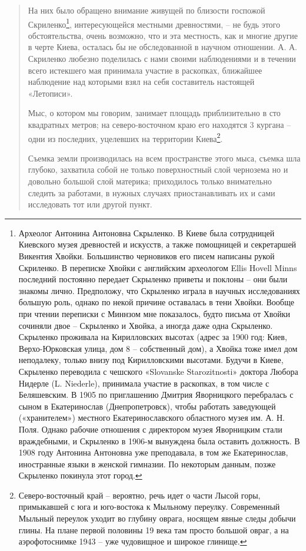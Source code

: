 \begin{quotation}
На них было обращено внимание живущей по близости госпожой Скриленко\footnote{Археолог Антонина Антоновна Скрыленко. В Киеве была сотрудницей Киевского музея древностей и искусств, а также помощницей и секретаршей Викентия Хвойки. Большинство черновиков его писем написаны рукой Скриленко. В переписке Хвойки с английским археологом Ellis Hovell Minns последний постоянно передает Скрыленко приветы и поклоны – они были знакомы лично. Предположу, что Скрыленко играла в научных исследованиях большую роль, однако по некой причине оставалась в тени Хвойки. Вообще при чтении переписки с Миннзом мне показалось, будто письма от Хвойки сочиняли двое – Скрыленко и Хвойка, а иногда даже одна Скрыленко. Скрыленко проживала на Кирилловских высотах (адрес за 1900 год: Киев, Верхо-Юрковская улица, дом 8 – собственный дом), а Хвойка тоже имел дом неподалеку, только внизу под Кирилловскими высотами. Будучи в Киеве, Скрыленко переводила с чешского «Slovanske Starozitnosti» доктора Любора Нидерле (L. Niederle), принимала участие в раскопках, в том числе с Беляшевским. В 1905 по приглашению Дмитрия Яворницкого перебралась с сыном в Екатеринослав (Днепропетровск), чтобы работать заведующей («хранителем») местного Екатеринославского областного музея им. А. Н. Поля. Однако рабочие отношения с директором музея Яворницким стали враждебными, и Скрыленко в 1906-м вынуждена была оставить должность. В 1908 году Антонина Антоновна уже преподавала, в том же Екатеринослав, иностранные языки в женской гимназии. По некоторым данным, позже Скрыленко покинула этот город.}, интересующейся местными древностями, – не будь этого обстоятельства, очень возможно, что и эта местность, как и многие другие в черте Киева, осталась бы не обследованной в научном отношении. А. А. Скриленко любезно поделилась с нами своими наблюдениями и в течении всего истекшего мая принимала участие в раскопках, ближайшее наблюдение над которыми взял на себя составитель настоящей «Летописи».

Мыс, о котором мы говорим, занимает площадь приблизительно в сто квадратных метров; на северо-восточном краю его находятся 3 кургана – одни из последних, уцелевших на территории Киева\footnote{Северо-восточный край – вероятно, речь идет о части Лысой горы, примыкавшей с юга и юго-востока к Мыльному переулку. Современный Мыльный переулок уходит во глубину оврага, носящем явные следы добычи глины. На плане первой половины 19 века там просто большой овраг, а на аэрофотоснимке 1943 – уже чудовищное и широкое глинище.}.

Съемка земли производилась на всем пространстве этого мыса, съемка шла глубоко, захватила собой не только поверхностный слой чернозема но и довольно большой слой материка; приходилось только внимательно следить за работами, в нужных случаях приостанавливать их и сами исследовать тот или другой пункт.


\end{quotation}
